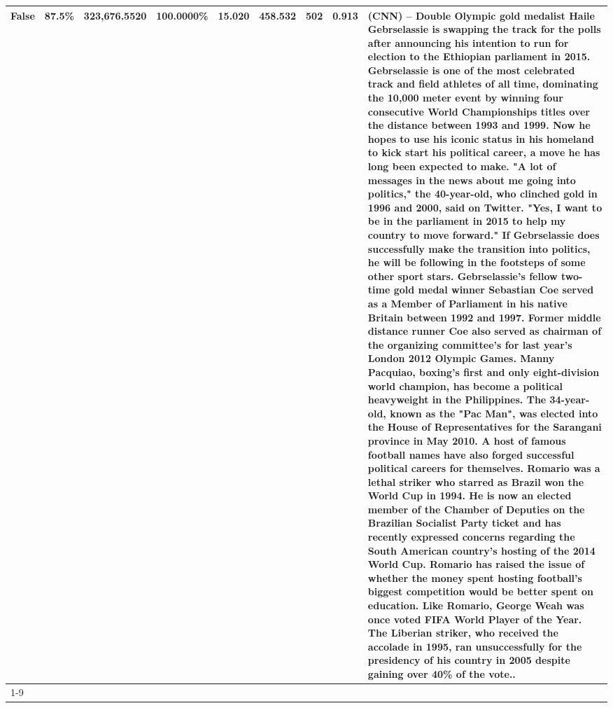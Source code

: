 \begin{table}[H]
{\begin{tabular}{lllrlllll}
False & 87.5\% & 323,676.5520 & \bfseries \color{red} 100.0000\% & 15.020 & 458.532 & 502 & 0.913 & (CNN) -- Double Olympic gold medalist Haile Gebrselassie is swapping the track for the polls after announcing his intention to run for election to the Ethiopian parliament in 2015. Gebrselassie is one of the most celebrated track and field athletes of all time, dominating the 10,000 meter event by winning four consecutive World Championships titles over the distance between 1993 and 1999. Now he hopes to use his iconic status in his homeland to kick start his political career, a move he has long been expected to make. "A lot of messages in the news about me going into politics," the 40-year-old, who clinched gold in 1996 and 2000, said on Twitter. "Yes, I want to be in the parliament in 2015 to help my country to move forward." If Gebrselassie does successfully make the transition into politics, he will be following in the footsteps of some other sport stars. Gebrselassie's fellow two-time gold medal winner Sebastian Coe served as a Member of Parliament in his native Britain between 1992 and 1997. Former middle distance runner Coe also served as chairman of the organizing committee's for last year's London 2012 Olympic Games. Manny Pacquiao, boxing's first and only eight-division world champion, has become a political heavyweight in the Philippines. The 34-year-old, known as the "Pac Man", was elected into the House of Representatives for the Sarangani province in May 2010. A host of famous football names have also forged successful political careers for themselves. Romario was a lethal striker who starred as Brazil won the World Cup in 1994. He is now an elected member of the Chamber of Deputies on the Brazilian Socialist Party ticket and has recently expressed concerns regarding the South American country's hosting of the 2014 World Cup. Romario has raised the issue of whether the money spent hosting football's biggest competition would be better spent on education. Like Romario, George Weah was once voted FIFA World Player of the Year. The Liberian striker, who received the accolade in 1995, ran unsuccessfully for the presidency of his country in 2005 despite gaining over 40\% of the vote.. \\
\cline{1-9}

\end{tabular}}
\end{table}
